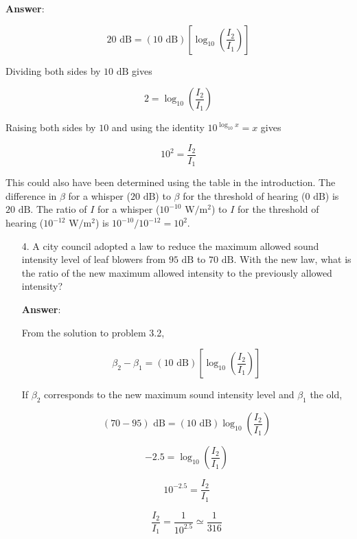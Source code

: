 \documentclass{article}
\begin{document}
\begin{enumerate}
        \ifsolutions
        \textbf{Answer}: 

        $$20\text{ dB} = (10 \text{ dB})\left[\log_{10}\left(\frac{I_2}{I_1}\right)\right]$$

        Dividing both sides by $10 \text{ dB}$ gives

        $$2 = \log_{10}\left(\frac{I_2}{I_1}\right)$$

        Raising both sides by $10$ and using the identity $10^{\log_{10}x} = x$ gives

        $$10^2 = \frac{I_2}{I_1}$$

        This could also have been determined using the table in the introduction. The difference in $\beta$ for a whisper ($20\text{ dB}$) to $\beta$ for the threshold of hearing ($0\text{ dB}$) is $20\text{ dB}$. The ratio of $I$ for a whisper ($10^{-10}\text{ W}/\text{m}^2$) to $I$ for the threshold of hearing ($10^{-12}\text{ W}/\text{m}^2$) is $10^{-10}/10^{-12}=10^2$.
        \else
        \vskip 72pt
        \fi

\end{enumerate}

\vskip 0.75pt

\begin{enumerate}

  \item[4.] A city council adopted a law to reduce the maximum allowed sound intensity level of leaf blowers from $95\text{ dB}$ to $70\text{ dB}$. With the new law, what is the ratio of the new maximum allowed intensity to the previously allowed intensity?

            \ifsolutions
            \textbf{Answer}:

            From the solution to problem 3.2,

            $$\beta_2-\beta_1 = (10 \text{ dB})\left[\log_{10}\left(\frac{I_2}{I_1}\right)\right]$$

            If $\beta_2$ corresponds to the new maximum sound intensity level and $\beta_1$ the old,

            $$(70-95)\text{ dB} =  (10 \text{ dB})\log_{10}\left(\frac{I_2}{I_1}\right)$$

            $$-2.5 = \log_{10}\left(\frac{I_2}{I_1}\right)$$

            $$10^{-2.5} = \frac{I_2}{I_1}$$

            $$\frac{I_2}{I_1} = \frac{1}{10^{2.5}} \simeq \frac{1}{316}$$
            \else
            \vskip 96pt
            \fi

\end{enumerate}
\end{document}
